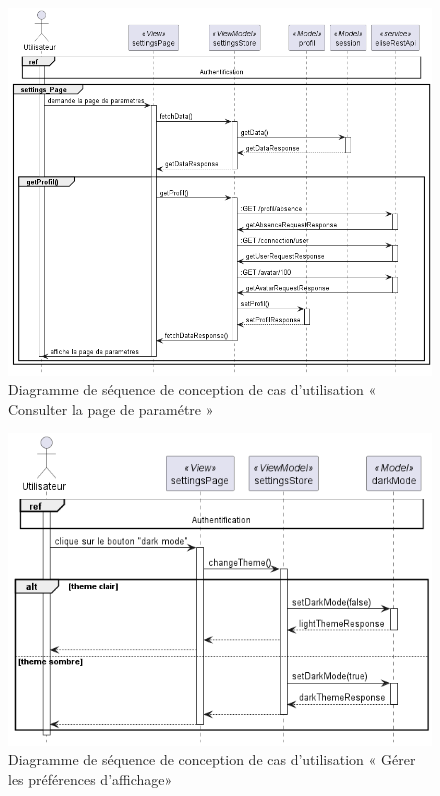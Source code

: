 
\begin{figure}[H]
  \centering
  \includegraphics[width=1\textwidth]{out/diagrams/sprint6/sequence_consult_settings_page/sequence_consult_settings_page}
  \caption{Diagramme de séquence de conception de cas d'utilisation « Consulter la page de paramétre »}
  \label{fig:conception_sequence_consult_settings_page}
\end{figure}

\begin{figure}[H]
  \centering
  \includegraphics[width=1\textwidth]{out/diagrams/sprint6/sequence_preferance_affichage/sequence_preferance_affichage}
  \caption{Diagramme de séquence de conception de cas d'utilisation « Gérer les préférences d'affichage»}
  \label{fig:conception_sequence_preferance_affichage}
\end{figure}


